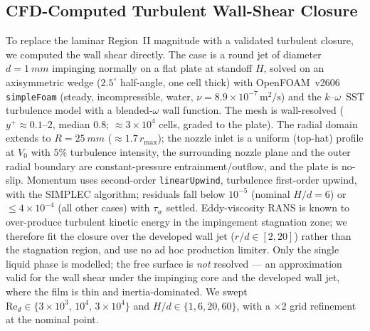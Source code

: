 \documentclass[aps,prfluids,reprint,amsmath,amssymb,floatfix]{revtex4-2}
\newcommand{\Rey}{\mathrm{Re}}
\begin{document}
\subsection{CFD-Computed Turbulent Wall-Shear Closure}
\label{sec:cfd}

To replace the laminar Region~II magnitude with a validated turbulent closure,
we computed the wall shear directly. The case is a round jet of diameter
$d = \SI{1}{mm}$ impinging normally on a flat plate at standoff $H$, solved on
an axisymmetric wedge ($2.5^\circ$ half-angle, one cell thick) with
OpenFOAM~v2606 \texttt{simpleFoam} (steady, incompressible, water,
$\nu = 8.9\times 10^{-7}\,\mathrm{m^2/s}$) and the $k$--$\omega$~SST turbulence
model with a blended-$\omega$ wall function. The mesh is wall-resolved
($y^+ \approx 0.1$--$2$, median $0.8$; $\approx 3\times10^4$ cells, graded to
the plate). The radial domain extends to $R = \SI{25}{mm}$ ($\approx 1.7\,
r_\mathrm{max}$); the nozzle inlet is a uniform (top-hat) profile at $V_0$
with $5\%$ turbulence intensity, the surrounding nozzle plane and the outer
radial boundary are constant-pressure entrainment/outflow, and the plate is
no-slip. Momentum uses second-order \texttt{linearUpwind}, turbulence
first-order upwind, with the SIMPLEC algorithm; residuals fall below $10^{-5}$
(nominal $H/d=6$) or $\le 4\times10^{-4}$ (all other cases) with
$\tau_w$ settled. Eddy-viscosity RANS is known to over-produce turbulent
kinetic energy in the impingement stagnation zone; we therefore fit the
closure over the developed wall jet ($r/d \in [2,20]$) rather than the
stagnation region, and use no ad hoc production limiter. Only the single
liquid phase is
modelled; the free surface is \emph{not} resolved --- an approximation valid
for the wall shear under the impinging core and the developed wall jet, where
the film is thin and inertia-dominated. We swept
$\Rey_d \in \{3\times 10^3,\,10^4,\,3\times 10^4\}$ and
$H/d \in \{1, 6, 20, 60\}$, with a $\times2$ grid refinement at the nominal
point.
\end{document}
